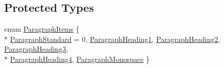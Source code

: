 \subsection*{Protected Types}
\begin{DoxyCompactItemize}
\item 
enum \hyperlink{class_m_rich_text_edit_adcd0ff6843f4184f25c01c6319015932}{Paragraph\+Items} \{ \\*
\hyperlink{class_m_rich_text_edit_adcd0ff6843f4184f25c01c6319015932ac49dd005736644c20f970ce62222ada4}{Paragraph\+Standard} = 0, 
\hyperlink{class_m_rich_text_edit_adcd0ff6843f4184f25c01c6319015932ae7fb1ea2e32dedff553eeced9384f697}{Paragraph\+Heading1}, 
\hyperlink{class_m_rich_text_edit_adcd0ff6843f4184f25c01c6319015932a0340bc71088f73f3d94991a320510231}{Paragraph\+Heading2}, 
\hyperlink{class_m_rich_text_edit_adcd0ff6843f4184f25c01c6319015932a92daf1588f854bedccb5649b96c56bd2}{Paragraph\+Heading3}, 
\\*
\hyperlink{class_m_rich_text_edit_adcd0ff6843f4184f25c01c6319015932a6c2142905b3b8440a7593e345dbd2e37}{Paragraph\+Heading4}, 
\hyperlink{class_m_rich_text_edit_adcd0ff6843f4184f25c01c6319015932a795555c32d4095a87dbe1b4749a92ab4}{Paragraph\+Monospace}
 \}
\end{DoxyCompactItemize}
